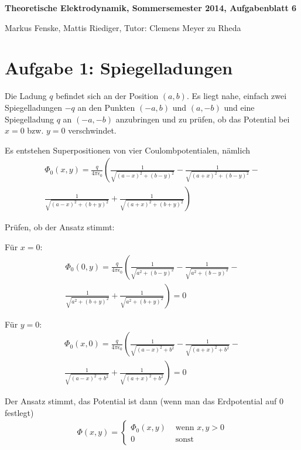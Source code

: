 \documentclass[a4paper,german,12pt,smallheadings]{scrartcl}
\begin{document}
\allowdisplaybreaks %
\begin{center}
\bfseries %
\sffamily %
\vspace{-40pt}
Theoretische Elektrodynamik, Sommersemester 2014, Aufgabenblatt 6

Markus Fenske, Mattis Riediger, Tutor: Clemens Meyer zu Rheda
\vspace{-10pt}
\end{center}

\section*{Aufgabe 1: Spiegelladungen}
Die Ladung $q$ befindet sich an der Position $(a,b)$. Es liegt nahe, einfach
zwei Spiegelladungen $-q$ an den Punkten $(-a, b)$ und $(a, -b)$ und eine
Spiegelladung $q$ an $(-a, -b)$ anzubringen und zu prüfen, ob das Potential bei
$x=0$ bzw. $y=0$ verschwindet.

Es entstehen Superpositionen von vier Coulombpotentialen, nämlich
\begin{align*}
  \Phi_0(x,y) = \frac{q}{4 \pi \epsilon_0} \left(
    \frac{1}{\sqrt{(a-x)^2 + (b-y)^2}} -
    \frac{1}{\sqrt{(a+x)^2 + (b-y)^2}} - \right. \\
    \left. \frac{1}{\sqrt{(a-x)^2 + (b+y)^2}} +
    \frac{1}{\sqrt{(a+x)^2 + (b+y)^2}}
  \right)
\end{align*}

Prüfen, ob der Ansatz stimmt:

Für $x=0$:
\begin{align*}
  \Phi_0(0,y) = \frac{q}{4 \pi \epsilon_0} \left(
    \frac{1}{\sqrt{a^2 + (b-y)^2}} -
    \frac{1}{\sqrt{a^2 + (b-y)^2}} - \right. \\
    \left. \frac{1}{\sqrt{a^2 + (b+y)^2}} +
    \frac{1}{\sqrt{a^2 + (b+y)^2}}
  \right) = 0
\end{align*}

Für $y=0$:
\begin{align*}
  \Phi_0(x,0) = \frac{q}{4 \pi \epsilon_0} \left(
    \frac{1}{\sqrt{(a-x)^2 + b^2}} -
    \frac{1}{\sqrt{(a+x)^2 + b^2}} - \right. \\
    \left. \frac{1}{\sqrt{(a-x)^2 + b^2}} +
    \frac{1}{\sqrt{(a+x)^2 + b^2}}
  \right) = 0
\end{align*}

Der Ansatz stimmt, das Potential ist dann (wenn man das Erdpotential auf 0
festlegt)
\begin{align*}
  \Phi(x,y) = \begin{cases}
    \Phi_0(x,y) & \text{ wenn } x,y > 0 \\
    0 & \text{ sonst}
  \end{cases}
\end{align*}
\end{document}
